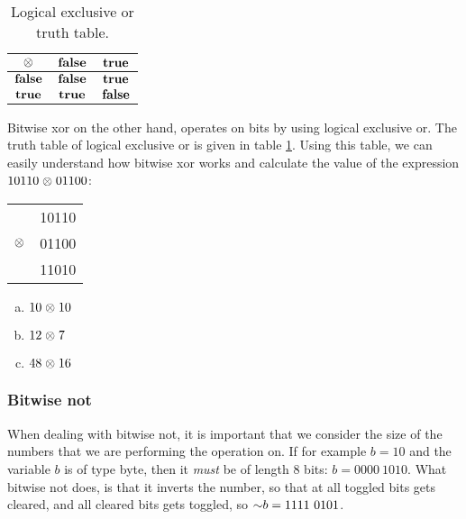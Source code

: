 \begin{table}
  \centering
  \begin{tabular}{|c|c|c|}
    \hline
    $\mathbf{\mathrel{\otimes}}$ & $\mathbf{\textbf{false}}$ & $\mathbf{\textbf{true}}$ \\ \hline
    $\mathbf{\textbf{false}}$ & $\mathbf{\textbf{false}}$ & $\mathbf{\textbf{true}}$ \\ \hline
    $\mathbf{\textbf{true}}$ & $\mathbf{\textbf{true}}$ & $\mathbf{\textbf{false}}$ \\ \hline
  \end{tabular}
  \caption{Logical exclusive or truth table.}
  \label{tab:log-exlusive-or-table}
\end{table}

Bitwise xor on the other hand, operates on bits by using logical
exclusive or. The truth table of logical exclusive or is given in
table \ref{tab:log-exlusive-or-table}. Using this table, we can easily
understand how bitwise xor works and calculate the value of the
expression $10110 \mathrel{\otimes} 01100$:

\begin{center}
  \begin{tabular}{lr}
    & 10110  \\
    $\mathrel{\otimes}$ & 01100 \\
    \hline
    & 11010 \\
  \end{tabular}
\end{center}

\begin{Exercise}[label={bitxor}]
  \begin{enumerate}[(a)]
  \item $10 \mathrel{\otimes} 10$
  \item $12 \mathrel{\otimes} 7$
  \item $48 \mathrel{\otimes} 16$
  \end{enumerate}
\end{Exercise}

\subsubsection{Bitwise not}

When dealing with bitwise not, it is important that we consider the
size of the numbers that we are performing the operation on. If for
example $b=10$ and the variable $b$ is of type byte, then it
\textit{must} be of length 8 bits: $b=0000\ 1010$. What bitwise not
does, is that it inverts the number, so that at all toggled bits gets
cleared, and all cleared bits gets toggled, so $\mathord{\sim} b = 1111\
0101$.

